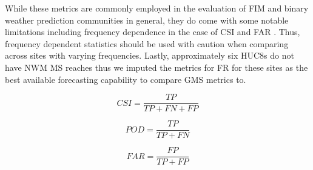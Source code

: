 While these metrics are commonly employed in the evaluation of FIM and binary weather prediction communities in general, they do come with some notable limitations including frequency dependence in the case of CSI and FAR \cite{gerapetritis2004behavior,stephens2014problems,schaefer1990critical,jolliffe2012forecast}.
Thus, frequency dependent statistics should be used with caution when comparing across sites with varying frequencies. 
Lastly, approximately six HUC8s do not have NWM MS reaches thus we imputed the metrics for FR for these sites as the best available forecasting capability to compare GMS metrics to.
%
\begin{linenomath*}
\begin{equation}
\label{eq:csi}
CSI = \frac{TP}{TP + FN + FP}
\end{equation}
\end{linenomath*}
%
\begin{linenomath*}
\begin{equation}
\label{eq:pod}
POD = \frac{TP}{TP + FN}
\end{equation}
\end{linenomath*}
%
\begin{linenomath*}
\begin{equation}
\label{eq:far}
FAR = \frac{FP}{TP + FP}
\end{equation}
\end{linenomath*}
%
